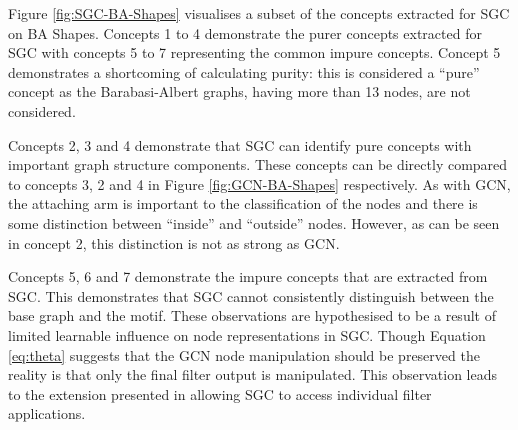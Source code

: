 
Figure \ref{fig:SGC-BA-Shapes} visualises a subset of the concepts extracted for SGC on BA Shapes.
Concepts 1 to 4 demonstrate the purer concepts extracted for SGC with concepts 5 to 7 representing the common impure concepts.
Concept 5 demonstrates a shortcoming of calculating purity: this is considered a ``pure'' concept as the Barabasi-Albert graphs, having more than 13 nodes, are not considered. 

Concepts 2, 3 and 4 demonstrate that SGC can identify pure concepts with important graph structure components.
These concepts can be directly compared to concepts 3, 2 and 4 in Figure \ref{fig:GCN-BA-Shapes} respectively.
As with GCN, the attaching arm is important to the classification of the nodes and there is some distinction between ``inside'' and ``outside'' nodes.
However, as can be seen in concept 2, this distinction is not as strong as GCN.

Concepts 5, 6 and 7 demonstrate the impure concepts that are extracted from SGC.
This demonstrates that SGC cannot consistently distinguish between the base graph and the motif.
These observations are hypothesised to be a result of limited learnable influence on node representations in SGC.
Though Equation \ref{eq:theta} suggests that the GCN node manipulation should be preserved the reality is that only the final filter output is manipulated.
This observation leads to the extension presented in  allowing SGC to access individual filter applications.

